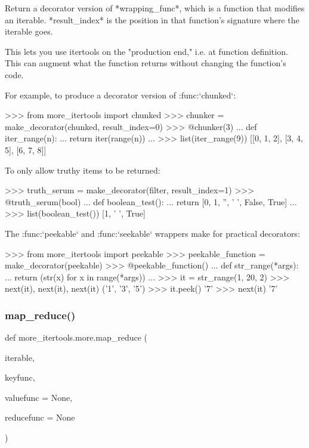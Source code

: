 \begin{DoxyVerb}Return a decorator version of *wrapping_func*, which is a function that
modifies an iterable. *result_index* is the position in that function's
signature where the iterable goes.

This lets you use itertools on the "production end," i.e. at function
definition. This can augment what the function returns without changing the
function's code.

For example, to produce a decorator version of :func:`chunked`:

    >>> from more_itertools import chunked
    >>> chunker = make_decorator(chunked, result_index=0)
    >>> @chunker(3)
    ... def iter_range(n):
    ...     return iter(range(n))
    ...
    >>> list(iter_range(9))
    [[0, 1, 2], [3, 4, 5], [6, 7, 8]]

To only allow truthy items to be returned:

    >>> truth_serum = make_decorator(filter, result_index=1)
    >>> @truth_serum(bool)
    ... def boolean_test():
    ...     return [0, 1, '', ' ', False, True]
    ...
    >>> list(boolean_test())
    [1, ' ', True]

The :func:`peekable` and :func:`seekable` wrappers make for practical
decorators:

    >>> from more_itertools import peekable
    >>> peekable_function = make_decorator(peekable)
    >>> @peekable_function()
    ... def str_range(*args):
    ...     return (str(x) for x in range(*args))
    ...
    >>> it = str_range(1, 20, 2)
    >>> next(it), next(it), next(it)
    ('1', '3', '5')
    >>> it.peek()
    '7'
    >>> next(it)
    '7'\end{DoxyVerb}
 \mbox{\label{namespacemore__itertools_1_1more_a67141a9a2ee17eae291e30e659365869}} 
\subsubsection{\texorpdfstring{map\+\_\+reduce()}{map\_reduce()}}
{\footnotesize\ttfamily def more\+\_\+itertools.\+more.\+map\+\_\+reduce (\begin{DoxyParamCaption}\item[{}]{iterable,  }\item[{}]{keyfunc,  }\item[{}]{valuefunc = {\ttfamily None},  }\item[{}]{reducefunc = {\ttfamily None} }\end{DoxyParamCaption})}


